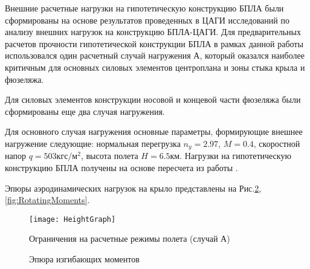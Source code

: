 Внешние расчетные нагрузки на гипотетическую конструкцию БПЛА были сформированы на основе результатов проведенных в ЦАГИ исследований \cite{BPS_TSAGI} по анализу внешних нагрузок на конструкцию БПЛА-ЦАГИ. Для предварительных расчетов прочности гипотетической конструкции БПЛА в рамках данной работы использовался один расчетный случай нагружения А, который оказался наиболее критичным для основных силовых элементов центроплана и зоны стыка крыла и фюзеляжа. 

Для силовых элементов конструкции носовой и концевой части фюзеляжа были сформированы еще два случая нагружения. 


Для основного случая нагружения основные параметры, формирующие внешнее нагружение следующие: нормальная перегрузка $n_y = 2.97$, $M = 0.4$, скоростной напор $q = 503 \text{кгс}/\text{м}^2$, высота полета $H = 6.5\text{км}$. Нагрузки на гипотетическую конструкцию БПЛА получены на основе пересчета из работы \cite{BPS}.

Эпюры аэродинамических нагрузок на крыло представлены на Рис.\ref{fig:BendingMoments},\ref{fig:RotatingMoments}.


\begin{figure}[H]
\centering
\texttt{[image: HeightGraph]}
\caption{Ограничения на расчетные режимы полета (случай А)}
\label{fig:ModeOfFlight}
\end{figure}



%


\begin{figure}[H]
\centering
\def\svgwidth{0.9\textwidth}

\caption{Эпюра изгибающих моментов}
\label{fig:BendingMoments}
\end{figure}


%

%

